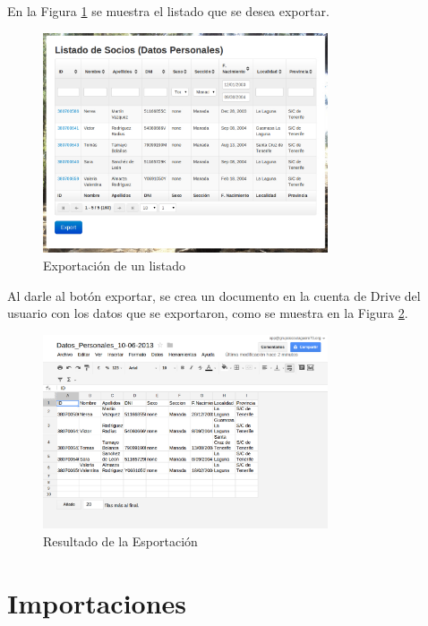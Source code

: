 En la Figura \ref{fig:list_export} se muestra el listado que se desea exportar.
\begin{figure}[H]
\begin{center}
\includegraphics[width=0.75\textwidth]{images/listado_export.jpg}
\caption{Exportación de un listado}
\label{fig:list_export}
\end{center}
\end{figure}

Al darle al botón exportar, se crea un documento en la cuenta de Drive del usuario con los datos que se exportaron, como se muestra en la Figura \ref{fig:export_drive}.\\

\begin{figure}[H]
\begin{center}
\includegraphics[width=0.75\textwidth]{images/result_export.jpg}
\caption{Resultado de la Esportación}
\label{fig:export_drive}
\end{center}
\end{figure}

\section{Importaciones}
\label{3:sec7}

